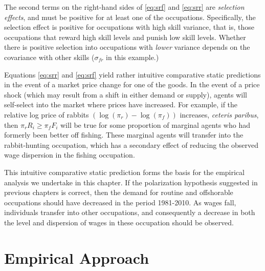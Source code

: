 The second terms on the right-hand sides of \eqref{eq:srf} and \eqref{eq:srr} are {\em selection effects}, and must be positive for at least one of the occupations. Specifically, the selection effect is positive for occupations with high skill variance, that is, those occupations that reward high skill levels and punish low skill levels. Whether there is positive selection into occupations with {\em lower} variance depends on the covariance with other skills ($\sigma_{fr}$ in this example.)

Equations \eqref{eq:srr} and \eqref{eq:srf} yield rather intuitive comparative static predictions in the event of a market price change for one of the goods. In the event of a price shock (which may result from a shift in either demand or supply), agents will self-select into the market where prices have increased. For example, if the relative log price of rabbits ${\left(\log(\pi_r)-\log(\pi_f)\right)}$ increases, {\em ceteris paribus}, then ${\pi_rR_i \geq \pi_fF_i}$ will be true for some proportion of marginal agents who had formerly been better off fishing. These marginal agents will transfer into the rabbit-hunting occupation, which has a secondary effect of reducing the observed wage dispersion in the fishing occupation.

This intuitive comparative static prediction forms the basis for the empirical analysis we undertake in this chapter. If the polarization hypothesis suggested in previous chapters is correct, then the demand for routine and offshorable occupations should have decreased in the period 1981-2010. As wages fall, individuals transfer into other occupations, and consequently a decrease in both the level and dispersion of wages in these occupation should be observed.


\section{Empirical Approach}\label{sec:emp}

